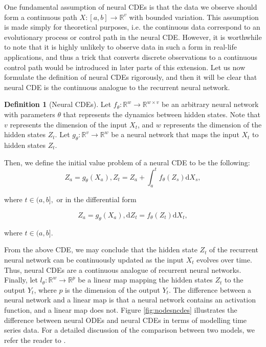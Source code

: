 \documentclass[a4paper,11pt,titlepage]{article}
\theoremstyle{definition}
\newtheorem{definition}{Definition}[section]
\theoremstyle{plain}
\theoremstyle{remark}
\begin{document}
One fundamental assumption of neural CDEs is that the data we observe should form a continuous path $X:[a,b]\rightarrow\mathbb{R}^v$ with bounded variation. This assumption is made simply for theoretical purposes, i.e. the continuous data correspond to an evolutionary process or control path in the neural CDE. However, it is worthwhile to note that it is highly unlikely to observe data in such a form in real-life applications, and thus a trick that converts discrete observations to a continuous control path would be introduced in later parts of this extension. Let us now formulate the definition of neural CDEs rigorously, and then it will be clear that neural CDE is the continuous analogue to the recurrent neural network.

\begin{definition}
    [Neural CDEs] Let $f_\theta:\mathbb{R}^w\rightarrow\mathbb{R}^{w\times v}$ be an arbitrary neural network with parameters $\theta$ that represents the dynamics between hidden states. Note that $v$ represents the dimension of the input $X_t$, and $w$ represents the dimension of the hidden states $Z_t$. Let $g_\theta:\mathbb{R}^v\rightarrow\mathbb{R}^w$ be a neural network that maps the input $X_t$ to hidden states $Z_t$.

Then, we define the initial value problem of a neural CDE to be the following:
$$Z_a=g_\theta(X_a), Z_t=Z_a+\int_a^tf_\theta(Z_s)\mathrm{d}X_s,$$ 

where $t\in(a,b],$ or in the differential form

$$Z_a=g_\theta(X_a), \mathrm{d}Z_t=f_\theta(Z_t)\mathrm{d}X_t,$$ 

where $t\in(a,b].$ \cite{kidger2022neural}
\end{definition}

From the above CDE, we may conclude that the hidden state $Z_t$ of the recurrent neural network can be continuously updated as the input $X_t$ evolves over time. Thus, neural CDEs are a continuous analogue of recurrent neural networks. Finally, let $l_\theta:\mathbb{R}^w\rightarrow\mathbb{R}^p$ be a linear map mapping the hidden states $Z_t$ to the output $Y_t$, where $p$ is the dimension of the output $Y_t$. The difference between a neural network and a linear map is that a neural network contains an activation function, and a linear map does not. Figure \ref{fig:nodesncdes} illustrates the difference between neural ODEs and neural CDEs in terms of modelling time series data. For a detailed discussion of the comparison between two models, we refer the reader to \cite{kidger2020}.
\end{document}
